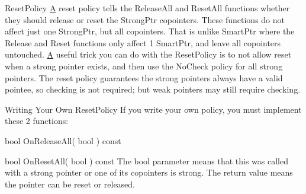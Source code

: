 \begin{DoxyParagraph}{Reset\+Policy}
\hyperlink{structA}{A} reset policy tells the Release\+All and Reset\+All functions whether they should release or reset the Strong\+Ptr copointers. These functions do not affect just one Strong\+Ptr, but all copointers. That is unlike Smart\+Ptr where the Release and Reset functions only affect 1 Smart\+Ptr, and leave all copointers untouched. \hyperlink{structA}{A} useful trick you can do with the Reset\+Policy is to not allow reset when a strong pointer exists, and then use the No\+Check policy for all strong pointers. The reset policy guarantees the strong pointers always have a valid pointee, so checking is not required; but weak pointers may still require checking.
\end{DoxyParagraph}
\begin{DoxyParagraph}{Writing Your Own Reset\+Policy}
If you write your own policy, you must implement these 2 functions\+:
\begin{DoxyEnumerate}
\item bool On\+Release\+All( bool ) const
\item bool On\+Reset\+All( bool ) const The bool parameter means that this was called with a strong pointer or one of its copointers is strong. The return value means the pointer can be reset or released. 
\end{DoxyEnumerate}
\end{DoxyParagraph}
